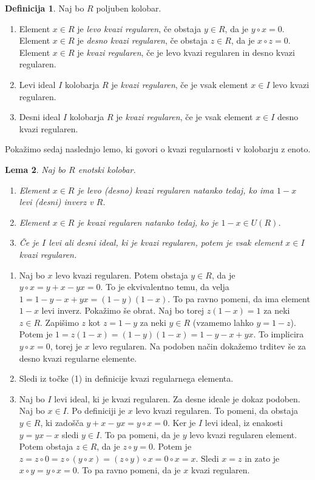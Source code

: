 \documentclass[a4paper, 12pt]{amsart}
\theoremstyle{definition} %
\newtheorem{definicija}{Definicija}[section]
\theoremstyle{plain} %
\newtheorem{lema}[definicija]{Lema}
\begin{document}
\begin{definicija}
Naj bo $R$ poljuben kolobar. 
\begin{enumerate}
\item Element $x\in R $ je \emph{levo kvazi regularen}, če obstaja $y\in R$, da je $y\circ x=0$. Element $x\in R$ je \emph{desno kvazi regularen}, če obstaja $z\in R$, da je $x\circ z = 0$. Element $x\in R$ je \emph{kvazi regularen}, če je levo kvazi regularen in desno kvazi regularen.
\item Levi ideal $I$ kolobarja $R$ je \emph{kvazi regularen}, če je vsak element $x\in I$ levo kvazi regularen.
\item Desni ideal $I$ kolobarja $R$ je \emph{kvazi regularen}, če je vsak element $x\in I$ desno kvazi regularen.
\end{enumerate}
\end{definicija}

Pokažimo sedaj naslednjo lemo, ki govori o kvazi regularnosti v kolobarju z enoto.

\begin{lema}
\label{kvaziRegularen-enotskiR}
Naj bo $R$ enotski kolobar. 
\begin{enumerate}
\item Element $x\in R$ je levo (desno) kvazi regularen natanko tedaj, ko ima $1-x$ levi (desni) inverz v $R$.
\item Element $x\in R$ je kvazi regularen natanko tedaj, ko je $1-x \in U(R)$.
\item Če je $I$ levi ali desni ideal, ki je kvazi regularen, potem je vsak element $x\in I$ kvazi regularen.
\end{enumerate}
\end{lema}

\proof
\begin{enumerate}
\item Naj bo $x$ levo kvazi regularen. Potem obstaja $y\in R$, da je $y\circ x = y+x - yx = 0$. To je ekvivalentno temu, da velja $1 = 1 -y-x + yx = (1-y)(1-x)$. To pa ravno  pomeni, da ima element $1-x$ levi inverz. Pokažimo še obrat. Naj bo torej $z(1-x) = 1$ za neki $z\in R$. Zapišimo $z$ kot $z = 1 -y$ za neki $y\in R$ (vzamemo lahko $y = 1-z$). Potem je $1=z(1-x) = (1-y ) (1-x) = 1 - y -x +yx$. To implicira $y\circ x = 0$, torej je $x$ levo regularen. Na podoben način dokažemo trditev še za desno kvazi regularne elemente.

\item Sledi iz točke (1) in definicije kvazi regularnega elementa. 

\item Naj bo $I$ levi ideal, ki je kvazi regularen. Za desne ideale je dokaz podoben. Naj bo $x\in I$. Po definiciji je $x$ levo kvazi regularen. To pomeni, da obstaja $y\in R$, ki zadošča $y+x - yx = y\circ x = 0$. Ker je $I$ levi ideal, iz enakosti $y = yx - x$ sledi $y\in I$. To pa pomeni, da je $y$ levo kvazi regularen element. Potem obstaja $z \in R$, da je $z\circ y =0$. Potem je $z = z\circ 0 = z \circ (y \circ x) = (z\circ y) \circ x = 0 \circ x = x$. Sledi $x=z$ in zato je $x \circ y = y\circ x = 0$. To pa ravno pomeni, da je $x$ kvazi regularen.
\end{enumerate}
\endproof
\end{document}
